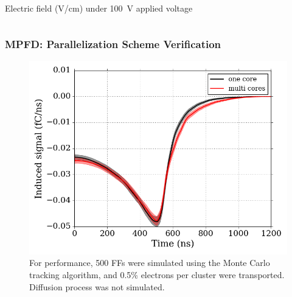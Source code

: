 \documentclass[fleqn]{beamer}
\begin{document}
\begin{frame}
\begin{columns}[c]
\begin{column}{.5\textwidth}
   \centering
   Electric field (V/cm) under 100~V applied voltage
  \end{column}
 \end{columns}
\end{frame}

\begin{frame}
 \frametitle{MPFD: Parallelization Scheme Verification}
 \begin{figure}
  \centering
  \includegraphics[width = .6\textwidth]{serial_vs_parallel_500nff_nodiff_mc}
  \caption{For performance, 500 FFs were simulated using the Monte Carlo tracking algorithm, and 0.5\% electrons per cluster were transported. Diffusion process was not simulated.}
 \end{figure}

\end{frame}
\end{document}
